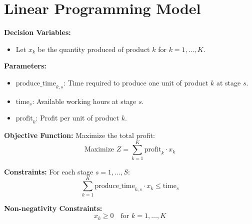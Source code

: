 \documentclass{article}
\begin{document}
\section*{Linear Programming Model}

\textbf{Decision Variables:}
\begin{itemize}
    \item Let \( x_k \) be the quantity produced of product \( k \) for \( k = 1, \ldots, K \).
\end{itemize}

\textbf{Parameters:}
\begin{itemize}
    \item \( \text{produce\_time}_{k,s} \): Time required to produce one unit of product \( k \) at stage \( s \).
    \item \( \text{time}_s \): Available working hours at stage \( s \).
    \item \( \text{profit}_k \): Profit per unit of product \( k \).
\end{itemize}

\textbf{Objective Function:}
Maximize the total profit:
\[
\text{Maximize } Z = \sum_{k=1}^{K} \text{profit}_k \cdot x_k
\]

\textbf{Constraints:}
For each stage \( s = 1, \ldots, S \):
\[
\sum_{k=1}^{K} \text{produce\_time}_{k,s} \cdot x_k \leq \text{time}_s
\]

\textbf{Non-negativity Constraints:}
\[
x_k \geq 0 \quad \text{for } k = 1, \ldots, K
\]
\end{document}

